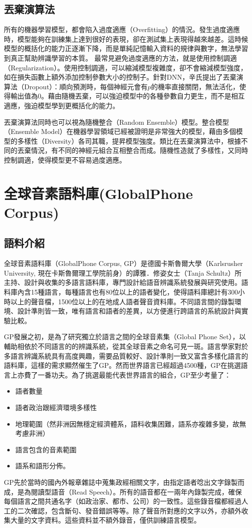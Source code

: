 \subsection{丟棄演算法}
所有的機器學習模型，都會陷入過度適應（Overfitting）的情況。發生過度適應時，模型能夠在訓練集上達到很好的表現，卻在測試集上表現得越來越差。這時候模型的概括化的能力正逐漸下降，而是單純記憶輸入資料的規律與數字，無法學習到真正幫助辨識學習的本質。
最常見避免過度適應的方法，就是使用控制調適（Regularization）。使用控制調適，可以縮減模型複雜度，卻不會縮減模型強度，如在損失函數上額外添加控制參數大小的控制子。針對DNN，辛氏提出了丟棄演算法（Dropout）：順向預測時，每個神經元會有$p$的機率直接關閉，無法活化，使得輸出值為$0$。藉由隨機丟棄，可以強迫模型中的各種參數自力更生，而不是相互適應，強迫模型學到更概括化的能力。

丟棄演算法同時也可以視為隨機整合（Random Ensemble）模型。整合模型（Ensemble Model）在機器學習領域已經被證明是非常強大的模型，藉由多個模型的多樣性（Diversity）各司其職，提昇模型強度。類比在丟棄演算法中，根據不同的丟棄情況，有不同的神經元組合互相整合而成。隨機性造就了多樣性，又同時控制調適，使得模型更不容易過度適應。
\section{全球音素語料庫(GlobalPhone Corpus)}
\subsection{語料介紹}
全球音素語料庫（GlobalPhone Corpus, GP）是德國卡斯魯爾大學（Karlsrusher University, 現在卡斯魯爾理工學院前身）的譚雅．修姿女士（Tanja Schultz）所主持、設計與收集的多語言語料庫，專門設計給語音辨識系統發展與研究使用。語料庫內含15種語言，每種語言也有80位以上的語者變化，使得語料庫總計有300小時以上的聲音檔，1500位以上的在地成人語者聲音資料庫。不同語言間的錄製環境、設計準則皆一致，唯有語言和語者的差異，以方便進行跨語言的系統設計與實驗比較。

GP發展之初，是為了研究獨立於語言之間的全球音素集（Global Phone Set），以輔助相依於不同語言的的辨識系統，從其全球音素之命名可見一斑。語言學家對於多語言辨識系統具有高度興趣，需要品質較好、設計準則一致又富含多樣化語言的語料庫，這樣的需求顯然催生了GP。然而世界語言已經超過4500種，GP在挑選語言上亦費了一番功夫。為了挑選最能代表世界語言的組合，GP至少考量了：
\begin{itemize}
\itemsep -2pt 
 \item 語者數量
 \item 語者政治跟經濟環境多樣性
 \item 地理範圍（然非洲因無穩定經濟體系，語料收集困難，語系亦複雜多變，故無考慮非洲）
 \item 語言包含的音素範圍
 \item 語系和語形分佈。
\end{itemize}
GP先於當時的國內外報章雜誌中蒐集政經相關文字，由指定語者唸出文字錄製而成，是為閱讀型語音（Read Speech）。所有的語音都在一兩年內錄製完成，確保每個語言之間共通名字（如政治家、都市、公司）的一致性。這些錄音檔都經過人工的二次確認，包含斷句、發音錯誤等等。除了聲音所對應的文字以外，亦額外收集大量的文字資料。這些資料並不額外錄音，僅供訓練語言模型。



